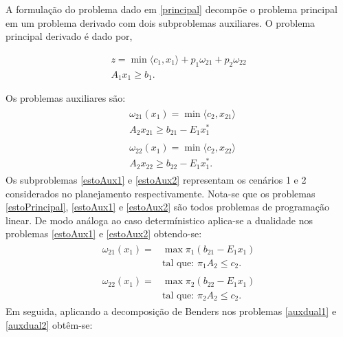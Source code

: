A formula\c c\~ao do problema dado em \ref{principal} decomp\~oe o problema principal em um problema derivado com dois
subproblemas auxiliares. O problema principal derivado \'e dado por,

{\setlength{\abovedisplayskip}{-15pt}
\begin{align}
	\label{estoPrincipal}
  z = \min  \langle c_1,x_1\rangle + p_1{\omega}_{21} + p_2 {\omega}_{22} \nonumber \\	
	A_1 x_1 \geq b_1.
\end{align}}

Os problemas auxiliares s\~ao:
{\setlength{\belowdisplayskip}{-5pt}
\begin{align}
	\label{estoAux1}
  \begin{split}	
  	&\omega_{21}(x_1) =\min \langle c_2,x_{21}\rangle \\
  	& A_2 x_{21} \geq b_{21} - E_1 x_1^{*} 
  \end{split}
\end{align}}
\begin{align}
	\label{estoAux2}
	\begin{split}	
 		&\omega_{22}(x_1) = \min  \langle c_2,x_{22}\rangle \\
		&A_2x_{22} \geq b_{22} - E_1 x_1^{*}. 
	\end{split}
\end{align}
Os subproblemas \ref{estoAux1} e \ref{estoAux2} representam os cen\'arios 1 e 2 considerados no planejamento respectivamente.
Nota-se que os problemas  \ref{estoPrincipal}, \ref{estoAux1} e \ref{estoAux2} s\~ao todos problemas de programa\c c\~ao
linear. De modo an\'aloga ao caso determ\'inistico aplica-se a dualidade nos problemas \ref{estoAux1} e \ref{estoAux2}
obtendo-se:
\begin{align}
  \begin{split}	
	  \omega_{21}(x_1) = &\max \pi_1 (b_{21} - E_1x_1 ) \\
	&\mbox{tal que: }\pi_1 A_2  \leq c_2.
  \end{split}
 	\label{auxdual1}
\end{align}
\begin{align}
  \begin{split}	
	  \omega_{22}(x_1) = &\max \pi_2 (b_{22} - E_1x_1 ) \\
	&\mbox{tal que: }\pi_2 A_2  \leq c_2.
  \end{split}
 	\label{auxdual2}
\end{align}
Em seguida, aplicando a decomposi\c c\~ao de Benders nos problemas \ref{auxdual1} e \ref{auxdual2} obt\^em-se:  
